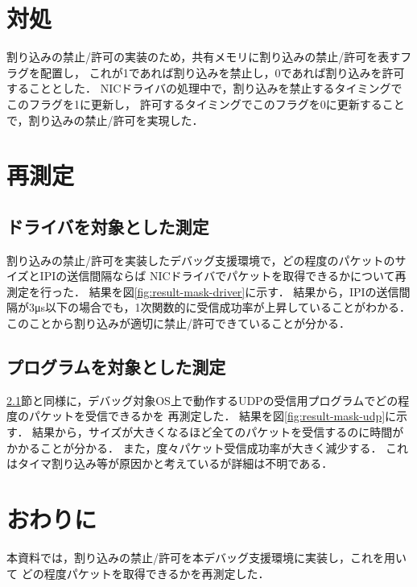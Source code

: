 \documentclass[12pt]{jsarticle}
\begin{document}
\section{対処}
割り込みの禁止/許可の実装のため，共有メモリに割り込みの禁止/許可を表すフラグを配置し，
これが1であれば割り込みを禁止し，0であれば割り込みを許可することとした．
NICドライバの処理中で，割り込みを禁止するタイミングでこのフラグを1に更新し，
許可するタイミングでこのフラグを0に更新することで，割り込みの禁止/許可を実現した．

\section{再測定}
\subsection{ドライバを対象とした測定}\label{driver}
割り込みの禁止/許可を実装したデバッグ支援環境で，どの程度のパケットのサイズとIPIの送信間隔ならば
NICドライバでパケットを取得できるかについて再測定を行った．
結果を図\ref{fig:result-mask-driver}に示す．
結果から，IPIの送信間隔が3μs以下の場合でも，1次関数的に受信成功率が上昇していることがわかる．
このことから割り込みが適切に禁止/許可できていることが分かる．

\subsection{プログラムを対象とした測定}
\ref{driver}節と同様に，デバッグ対象OS上で動作するUDPの受信用プログラムでどの程度のパケットを受信できるかを
再測定した．
結果を図\ref{fig:result-mask-udp}に示す．
結果から，サイズが大きくなるほど全てのパケットを受信するのに時間がかかることが分かる．
また，度々パケット受信成功率が大きく減少する．
これはタイマ割り込み等が原因かと考えているが詳細は不明である．

\section{おわりに}
本資料では，割り込みの禁止/許可を本デバッグ支援環境に実装し，これを用いて
どの程度パケットを取得できるかを再測定した．
\end{document}
